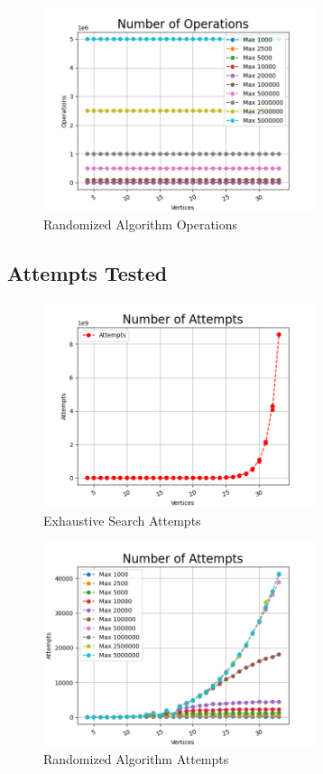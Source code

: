 \documentclass[]{revdetua}
\begin{document}
\begin{figure}[h]
    \centering
    \includegraphics[width=8cm]{operations_randomized.png}
    \caption{Randomized Algorithm Operations}
\end{figure}

\subsection{Attempts Tested}

\begin{figure}[h]
    \centering
    \includegraphics[width=8cm]{attempts_exhaustive.png}
    \caption{Exhaustive Search Attempts}
\end{figure}

\begin{figure}[h]
    \centering
    \includegraphics[width=8cm]{attempts_randomized.png}
    \caption{Randomized Algorithm Attempts}
\end{figure}
\end{document}
